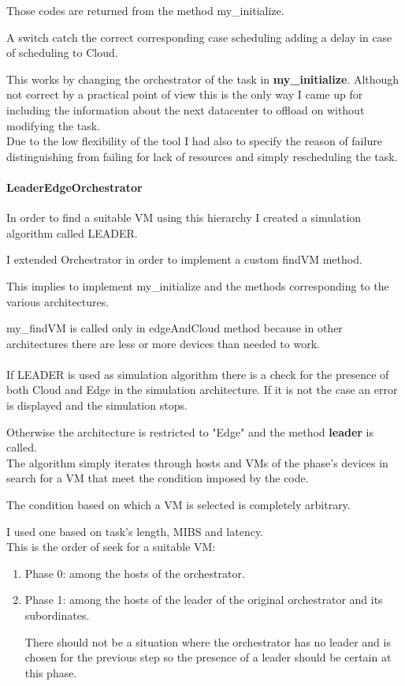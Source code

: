 \documentclass[12pt]{report}
\begin{document}
Those codes are returned from the method my\_initialize.

A switch catch the correct corresponding case scheduling  adding a delay in case of scheduling to Cloud.

This works by changing the orchestrator of the task in \textbf{my\_initialize}. Although not correct by a practical point of view this is the only way I came up for including the information about the next datacenter to offload on without modifying the task.\\
Due to the low flexibility of the tool I had also to specify the reason of failure distinguishing from failing for lack of resources and simply rescheduling the task.


\paragraph{LeaderEdgeOrchestrator}

In order to find a suitable VM using this hierarchy I created a simulation algorithm called LEADER.

I extended Orchestrator in order to implement a custom findVM method.

This implies to implement my\_initialize and the methods corresponding to the various architectures.

my\_findVM is called only in edgeAndCloud method because in other architectures there are less or more devices than needed to work.\\\\
If LEADER is used as simulation algorithm there is a check for the presence of both Cloud and Edge in the simulation architecture. If it is not the case an error is displayed and the simulation stops.

Otherwise the architecture is restricted to "Edge" and the method \textbf{leader} is called.\\

The algorithm simply iterates through hosts and VMs of the phase's devices in search for a VM that meet the condition imposed by the code.

The condition based on which a VM is selected is completely arbitrary.

I used one based on task's length, MIBS and latency.\\

This is the order of seek for a suitable VM:
\begin{enumerate}
	\item Phase 0: among the hosts of the orchestrator.
	\item Phase 1: among the hosts of the leader of the original orchestrator and its subordinates.
	
	There should not be a situation where the orchestrator has no leader and is chosen for the previous step so the presence of a leader should be certain at this phase.
\end{enumerate}
\end{document}
